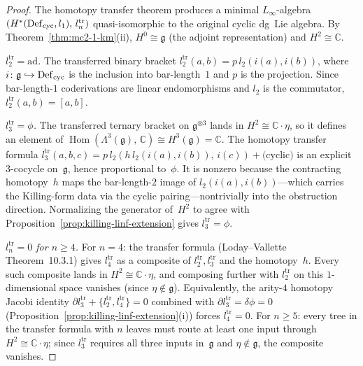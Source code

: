 \begin{proof}
The homotopy transfer theorem produces a minimal $L_\infty$-algebra
$(H^*(\operatorname{Def}_{\mathrm{cyc}}, l_1),\, l_n^{\mathrm{tr}})$ quasi-isomorphic to the
original cyclic dg~Lie algebra.  By
Theorem~\ref{thm:mc2-1-km}(ii), $H^0 \cong \mathfrak{g}$ (the
adjoint representation) and $H^2 \cong \mathbb{C}$.

\emph{$l_2^{\mathrm{tr}} = \mathrm{ad}$.}
The transferred binary bracket $l_2^{\mathrm{tr}}(a,b) =
p\,l_2(i(a), i(b))$, where $i\colon \mathfrak{g} \hookrightarrow
\operatorname{Def}_{\mathrm{cyc}}$ is the inclusion into bar-length~$1$ and $p$ is the
projection.  Since bar-length-$1$ coderivations are linear
endomorphisms and $l_2$ is the commutator, $l_2^{\mathrm{tr}}(a,b)
= [a,b]$.

\emph{$l_3^{\mathrm{tr}} = \phi$.}
The transferred ternary bracket on $\mathfrak{g}^{\otimes 3}$
lands in $H^2 \cong \mathbb{C}\cdot\eta$, so it defines an element of
$\operatorname{Hom}(\Lambda^3(\mathfrak{g}),\, \mathbb{C})
\cong H^3(\mathfrak{g}) = \mathbb{C}$.
The homotopy transfer formula
$l_3^{\mathrm{tr}}(a,b,c) = p\,l_2(h\,l_2(i(a),i(b)),\, i(c))
+ \text{(cyclic)}$
is an explicit $3$-cocycle on~$\mathfrak{g}$, hence proportional
to~$\phi$.  It is nonzero because the contracting homotopy~$h$
maps the bar-length-$2$ image of $l_2(i(a),i(b))$---which carries
the Killing-form data via the cyclic pairing---nontrivially
into the obstruction direction.
Normalizing the generator of~$H^2$ to agree with
Proposition~\ref{prop:killing-linf-extension}
gives $l_3^{\mathrm{tr}} = \phi$.

\emph{$l_n^{\mathrm{tr}} = 0$ for $n \geq 4$.}
For $n = 4$: the transfer formula
(Loday--Vallette \cite{LV12} Theorem~10.3.1) gives
$l_4^{\mathrm{tr}}$ as a composite of $l_2^{\mathrm{tr}}, l_3^{\mathrm{tr}}$
and the homotopy~$h$.  Every such composite lands in
$H^2 \cong \mathbb{C}\cdot\eta$, and composing further with
$l_2^{\mathrm{tr}}$ on this $1$-dimensional space vanishes
(since $\eta \notin \mathfrak{g}$).  Equivalently, the arity-$4$
homotopy Jacobi identity $\partial l_3^{\mathrm{tr}} +
\{l_2^{\mathrm{tr}}, l_4^{\mathrm{tr}}\} = 0$ combined with
$\partial l_3^{\mathrm{tr}} = \delta\phi = 0$
(Proposition~\ref{prop:killing-linf-extension}(i)) forces
$l_4^{\mathrm{tr}} = 0$.
For $n \geq 5$: every tree in the transfer formula with $n$ leaves
must route at least one input through $H^2 \cong \mathbb{C}\cdot\eta$;
since $l_3^{\mathrm{tr}}$ requires all three inputs in~$\mathfrak{g}$
and $\eta \notin \mathfrak{g}$, the composite vanishes.
\end{proof}

